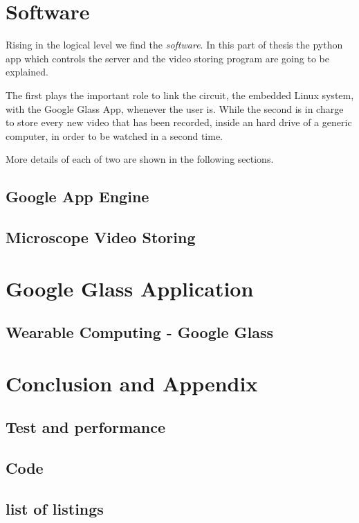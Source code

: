 \documentclass[a4paper,12pt,openany,twoside, abstracton]{book}%
\makeatletter
\newcommand*{\lolnoheading}{\@starttoc{lol}}
\makeatother
\begin{document}
\part{Software}
Rising in the logical level we find the \textit{software}. In this part of thesis the python app which controls the server and the video storing program are going to be explained.

The first plays the important role to link the circuit, the embedded Linux system, with the Google Glass App, whenever the user is. While the second is in charge to store every new video that has been recorded, inside an hard drive of a generic computer, in order to be watched in a second time.  

More details of each of two are shown in the following sections.
\chapter{Google App Engine}

\chapter{Microscope Video Storing}

\part{Google Glass Application}
\clearpage
\chapter{Wearable Computing - Google Glass }\label{ch:IIIintroduction}


\clearpage
\part{Conclusion and Appendix}
\chapter{Test and performance}\label{sec:Perf}


\appendix
\chapter{Code}


\cite{SNOA529A}

\clearpage
\listoffigures
{}
\clearpage
\chapter*{list of listings}
\lolnoheading

%






\end{document}
